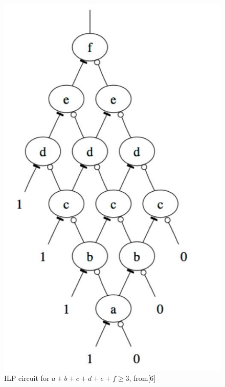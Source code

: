     \begin{figure}[H]
    \centering
    \includegraphics[scale=0.25]{images/ILP}
    \caption{ILP circuit for $a+b+c+d+e+f \geq 3$, from[6]}
    \end{figure}

